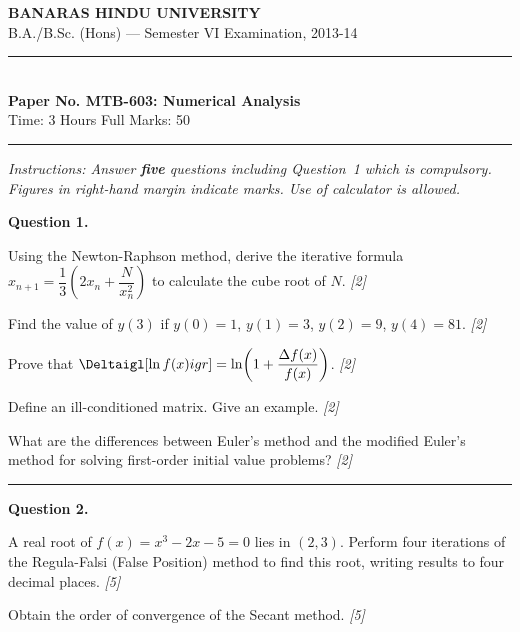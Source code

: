 \documentclass[11pt,a4paper]{article}
\newcommand{\pts}[1]{\hfill   \textit{[#1]}}
\begin{document}
\begin{center}
  {\large\bfseries BANARAS HINDU UNIVERSITY}\\[2pt]
  {\normalsize B.A./B.Sc. (Hons) --- Semester VI Examination, 2013-14}\\[6pt]
  \rule{0.8\linewidth}{0.5pt}\\[6pt]
  {\large\bfseries Paper No. MTB-603: Numerical Analysis}\\[4pt]
  {\normalsize Time: 3 Hours \hfill Full Marks: 50}
\end{center}
\rule{\linewidth}{0.4pt}
\smallskip



\noindent   \textit{Instructions: Answer   \textbf{five} questions including Question~1 which is compulsory. Figures in right-hand margin indicate marks. Use of calculator is allowed.}
\bigskip




\noindent   \textbf{Question 1.}

\begin{parts}
  \item Using the Newton-Raphson method, derive the iterative formula $x_{n+1} = \dfrac{1}{3}\!\left(2x_n + \dfrac{N}{x_n^2}\right)$ to calculate the cube root of $N$. \pts{2}
  \item Find the value of $y(3)$ if $y(0)=1$, $y(1)=3$, $y(2)=9$, $y(4)=81$. \pts{2}
  \item Prove that $\Deltaigl[\ln f(x)igr] = \ln\!\left(1 + \dfrac{\Delta f(x)}{f(x)}\right)$. \pts{2}
  \item Define an ill-conditioned matrix. Give an example. \pts{2}
  \item What are the differences between Euler's method and the modified Euler's method for solving first-order initial value problems? \pts{2}
\end{parts}

\medskip\rule{\linewidth}{0.2pt}

\medskip


\noindent   \textbf{Question 2.}

\begin{parts}
  \item A real root of $f(x) = x^3 - 2x - 5 = 0$ lies in $(2, 3)$. Perform four iterations of the Regula-Falsi (False Position) method to find this root, writing results to four decimal places. \pts{5}
  \item Obtain the order of convergence of the Secant method. \pts{5}
\end{parts}
\end{document}
